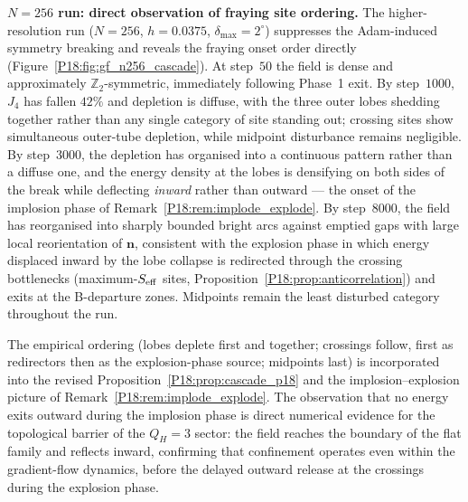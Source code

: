 \documentclass[11pt,a4paper]{article}
\theoremstyle{definition}\newtheorem{definition}[theorem]{Definition}
\theoremstyle{remark}
\newcommand{\QH}{Q_H}
\newcommand{\Ztwo}{\mathbb{Z}_2}
\begin{document}
\textbf{$N=256$ run: direct observation of fraying site ordering.}
The higher-resolution run ($N=256$, $h=0.0375$, $\delta_{\max}=2^\circ$)
suppresses the Adam-induced symmetry breaking and reveals the fraying
onset order directly (Figure~\ref{P18:fig:gf_n256_cascade}).  At step~$50$
the field is dense and approximately $\Ztwo$-symmetric, immediately
following Phase~1 exit.  By step~$1000$, $J_4$ has fallen $42\%$ and
depletion is diffuse, with the three outer lobes shedding together
rather than any single category of site standing out; crossing sites
show simultaneous outer-tube depletion, while midpoint disturbance
remains negligible.  By step~$3000$, the depletion has organised into
a continuous pattern rather than a diffuse one, and the energy density
at the lobes is densifying on both sides of the break while deflecting
\emph{inward} rather than outward --- the onset of the implosion phase
of Remark~\ref{P18:rem:implode_explode}.  By step~$8000$, the field has
reorganised into sharply bounded bright arcs against emptied gaps with
large local reorientation of $\mathbf{n}$, consistent with the
explosion phase in which energy displaced inward by the lobe collapse
is redirected through the crossing bottlenecks (maximum-$S_{\rm eff}$
sites, Proposition~\ref{P18:prop:anticorrelation}) and exits at the
B-departure zones.  Midpoints remain
the least disturbed category throughout the run.

The empirical ordering (lobes deplete first and together; crossings
follow, first as redirectors then as the explosion-phase source;
midpoints last) is incorporated into the revised
Proposition~\ref{P18:prop:cascade_p18} and the implosion--explosion picture of
Remark~\ref{P18:rem:implode_explode}.  The observation that no energy
exits outward during the implosion phase is direct numerical evidence
for the topological barrier of the $\QH=3$ sector: the field reaches
the boundary of the flat family and reflects inward, confirming that
confinement operates even within the gradient-flow dynamics, before
the delayed outward release at the crossings during the explosion
phase.
\end{document}
